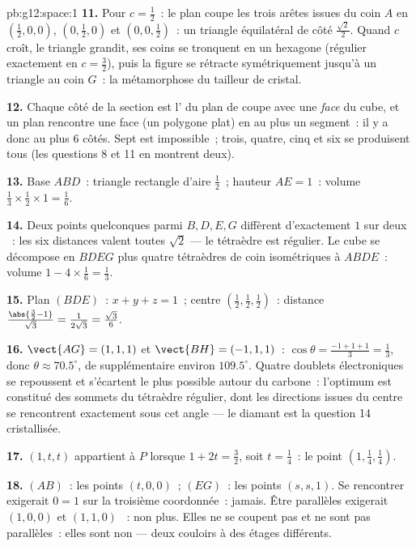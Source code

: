 \begin{solution}{pb:g12:space:1}
\textbf{11.} Pour $c = \frac12$~: le plan coupe les trois arêtes
issues du coin $A$ en $\left(\frac12,0,0\right)$,
$\left(0,\frac12,0\right)$ et $\left(0,0,\frac12\right)$~: un
triangle équilatéral de côté $\frac{\sqrt2}{2}$. Quand $c$ croît,
le triangle grandit, ses coins se tronquent en un hexagone
(régulier exactement en $c = \frac32$), puis la figure se rétracte
symétriquement jusqu'à un triangle au coin $G$~: la métamorphose du
tailleur de cristal.

\textbf{12.} Chaque côté de la section est l' du plan de
coupe avec une \emph{face} du cube, et un plan rencontre une face
(un polygone plat) en au plus un segment~: il y a donc au plus $6$
côtés. Sept est impossible~; trois, quatre, cinq et six se
produisent tous (les questions 8 et 11 en montrent deux).

\textbf{13.} Base $ABD$~: triangle rectangle d'aire $\frac12$~;
hauteur $AE = 1$~: volume
$\frac13 \times \frac12 \times 1 = \frac16$.

\textbf{14.} Deux points quelconques parmi $B, D, E, G$ diffèrent
d'exactement $1$ sur deux ~: les six distances valent
toutes $\sqrt2$ --- le tétraèdre est régulier. Le cube se
décompose en $BDEG$ plus quatre tétraèdres de coin isométriques à
$ABDE$~: volume $1 - 4 \times \frac16 = \frac13$.

\textbf{15.} Plan $(BDE)$~: $x + y + z = 1$~; centre
$\left(\frac12,\frac12,\frac12\right)$~: distance
$\frac{\abs{\frac32 - 1}}{\sqrt3} = \frac{1}{2\sqrt3} =
\frac{\sqrt3}{6}$.

\textbf{16.} $\vect{AG} = (1,1,1)$ et $\vect{BH} = (-1,1,1)$~:
$\cos\theta = \frac{-1 + 1 + 1}{3} = \frac13$, donc
$\theta \approx 70.5^\circ$, de supplémentaire environ
$109.5^\circ$. Quatre doublets électroniques se repoussent et
s'écartent le plus possible autour du carbone~: l'optimum est
constitué des sommets du tétraèdre régulier, dont les directions
issues du centre se rencontrent exactement sous cet angle --- le
diamant est la question 14 cristallisée.

\textbf{17.} $(1, t, t)$ appartient à $P$ lorsque
$1 + 2t = \frac32$, soit $t = \frac14$~: le point
$\left(1, \frac14, \frac14\right)$.

\textbf{18.} $(AB)$~: les points $(t, 0, 0)$~; $(EG)$~: les points
$(s, s, 1)$. Se rencontrer exigerait $0 = 1$ sur la troisième
coordonnée~: jamais. Être parallèles exigerait $(1,0,0)$ et
$(1,1,0)$ ~: non plus. Elles ne se coupent pas et
ne sont pas parallèles~: elles sont non
 --- deux couloirs à des étages différents.


\end{solution}
